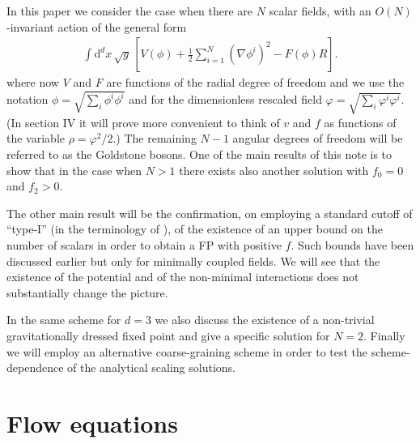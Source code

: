 \documentclass[11pt]{book} %
\numberwithin{equation}{chapter}
\begin{document}
In this paper we consider the case when
there are $N$ scalar fields, with an $O(N)$-invariant
action of the general form
\begin{align}
  \label{action}
  \int \mathrm d^dx \, \sqrt{g} \,
  \left[ V(\phi) + \frac{1}{2}\sum_{i=1}^N \left( \nabla\phi^i \right)^2 - F(\phi)R \right] .
\end{align}
where now $V$ and $F$ are functions of the radial degree of freedom
and we use the notation $\phi=\sqrt{\sum_i \phi^i\phi^i}$ and for the dimensionless rescaled field
$\varphi=\sqrt{\sum_i \varphi^i \varphi^i}$.
(In section IV it will prove more convenient to think of
$v$ and $f$ as functions of the variable $\rho=\varphi^2/2$.)
The remaining $N-1$ angular degrees
of freedom will be referred to as the Goldstone bosons.
One of the main results of this note is to show that in the case
when $N>1$ there exists also another solution with $f_0=0$ and $f_2>0$.

The other main result will be the confirmation,
on employing a standard cutoff of ``type-I''
(in the terminology of \cite{Codello:2008vh}),
of the existence  of an upper bound on the number of scalars in order to obtain a FP with positive $f$.
Such bounds have been discussed earlier but only for minimally
coupled fields.
We will see that the existence of the potential and of the non-minimal interactions does
not substantially change the picture.

In the same scheme for $d=3$ we also discuss the existence
of a non-trivial gravitationally dressed fixed point
and give a specific solution for $N=2$.
Finally we will employ an alternative coarse-graining scheme
in order to test the scheme-dependence of the analytical scaling solutions.


\section{Flow equations}
\end{document}
